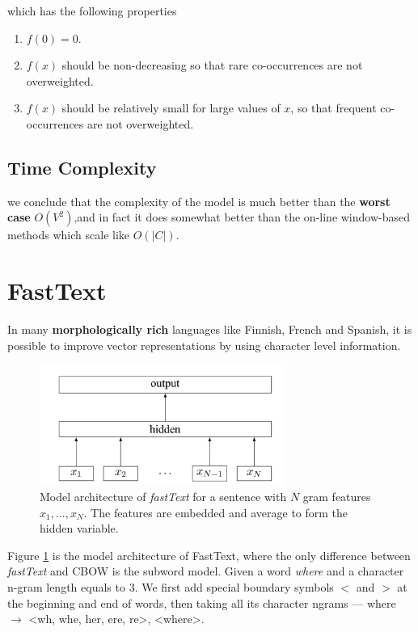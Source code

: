 \documentclass[a3paper, 12pt]{book} %
\begin{document}
which has the following properties
\begin{enumerate}
	\item $f(0)=0$.
	\item $f(x)$ should be non-decreasing so that rare co-occurrences are not overweighted.
	\item $f(x)$ should be relatively small for large values of $x$, so that frequent co-occurrences are
	not overweighted.
\end{enumerate}

\subsection{Time Complexity}

we conclude that the complexity of the model is much better than the \textbf{worst case} $O(V^2)$,and in fact it does somewhat better than the on-line window-based methods which scale like $O(|C|)$.

\section{FastText}
In many \textbf{morphologically rich} languages like Finnish, French and Spanish, \citep{bojanowski2016enriching} it is possible to improve vector representations by using character level information.

\begin{figure}[htpb]
	\centering
	\includegraphics[width=8cm]{figures/fasttext_model_architecture.png}
	\caption{Model architecture of \emph{fastText} for a sentence with $N$ gram features $x_1,...,x_N$. The features are embedded and average to form the hidden variable.}
	\label{fig:fasttext}
\end{figure}

Figure \ref{fig:fasttext} is the model architecture of FastText, where the only difference between \emph{fastText} and CBOW is the subword model. Given a word \emph{where} and a character n-gram length equals to $3$. We first add special boundary symbols $<$ and $>$ at the beginning and end of words, then taking all its character ngrams --- where $\to$ <wh, whe, her, ere, re>, <where>.
\end{document}
